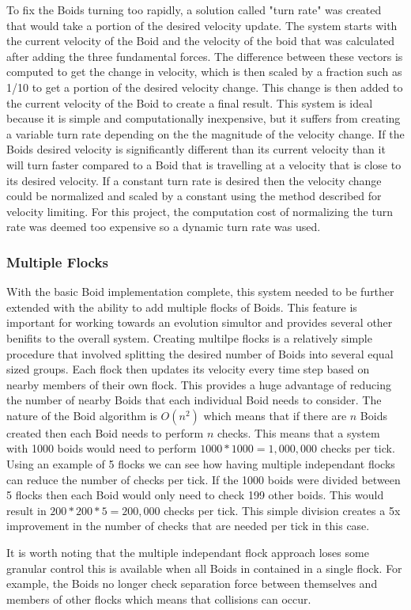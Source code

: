 \documentclass{egpubl}
\begin{document}
To fix the Boids turning too rapidly, a solution called "turn rate" was created that would take a portion of the desired velocity update. The system starts with the current velocity of the Boid and the velocity of the boid that was calculated after adding the three fundamental forces. The difference between these vectors is computed to get the change in velocity, which is then scaled by a fraction such as 1/10 to get a portion of the desired velocity change. This change is then added to the current velocity of the Boid to create a final result. This system is ideal because it is simple and computationally inexpensive, but it suffers from creating a variable turn rate depending on the the magnitude of the velocity change. If the Boids desired velocity is significantly different than its current velocity than it will turn faster compared to a Boid that is travelling at a velocity that is close to its desired velocity. If a constant turn rate is desired then the velocity change could be normalized and scaled by a constant using the method described for velocity limiting. For this project, the computation cost of normalizing the turn rate was deemed too expensive so a dynamic turn rate was used.
\subsubsection{Multiple Flocks}
With the basic Boid implementation complete, this system needed to be further extended with the ability to add multiple flocks of Boids. This feature is important for working towards an evolution simultor and provides several other benifits to the overall system. Creating multilpe flocks is a relatively simple procedure that involved splitting the desired number of Boids into several equal sized groups. Each flock then updates its velocity every time step based on nearby members of their own flock. This provides a huge advantage of reducing the number of nearby Boids that each individual Boid needs to consider. The nature of the Boid algorithm is $O(n^2)$ which means that if there are $n$ Boids created then each Boid needs to perform $n$ checks. This means that a system with 1000 boids would need to perform $1000 * 1000 =  1,000,000$ checks per tick. Using an example of 5 flocks we can see how having multiple independant flocks can reduce the number of checks per tick. If the 1000 boids were divided between 5 flocks then each Boid would only need to check 199 other boids. This would result in $200 * 200 * 5 = 200,000$ checks per tick. This simple division creates a 5x improvement in the number of checks that are needed per tick in this case.
\par
It is worth noting that the multiple independant flock approach loses some granular control this is available when all Boids in contained in a single flock. For example, the Boids no longer check separation force between themselves and members of other flocks which means that collisions can occur.
\end{document}
